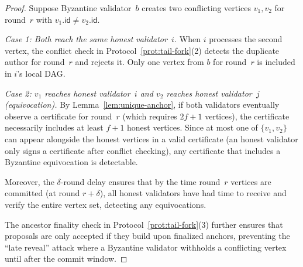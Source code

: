 \documentclass[11pt,a4paper]{article}
\theoremstyle{definition}
\theoremstyle{remark}
\begin{document}
\begin{proof}
Suppose Byzantine validator~$b$ creates two conflicting vertices
$v_1, v_2$ for round~$r$ with $v_1.\mathsf{id} \neq v_2.\mathsf{id}$.

\emph{Case 1: Both reach the same honest validator~$i$.}
When $i$ processes the second vertex, the conflict check in
Protocol~\ref{prot:tail-fork}(2) detects the duplicate author for
round~$r$ and rejects it. Only one vertex from $b$ for round~$r$ is
included in $i$'s local DAG.

\emph{Case 2: $v_1$ reaches honest validator~$i$ and $v_2$ reaches
honest validator~$j$ (equivocation).}
By Lemma~\ref{lem:unique-anchor}, if both validators eventually observe
a certificate for round~$r$ (which requires $2f+1$ vertices), the
certificate necessarily includes at least $f+1$ honest vertices.
Since at most one of $\{v_1, v_2\}$ can appear alongside the honest
vertices in a valid certificate (an honest validator only signs a
certificate after conflict checking), any certificate that includes a
Byzantine equivocation is detectable.

Moreover, the $\delta$-round delay ensures that by the time round~$r$
vertices are committed (at round $r + \delta$), all honest validators
have had time to receive and verify the entire vertex set, detecting
any equivocations.

The ancestor finality check in Protocol~\ref{prot:tail-fork}(3) further
ensures that proposals are only accepted if they build upon finalized
anchors, preventing the ``late reveal'' attack where a Byzantine validator
withholds a conflicting vertex until after the commit window.
\end{proof}
\end{document}
